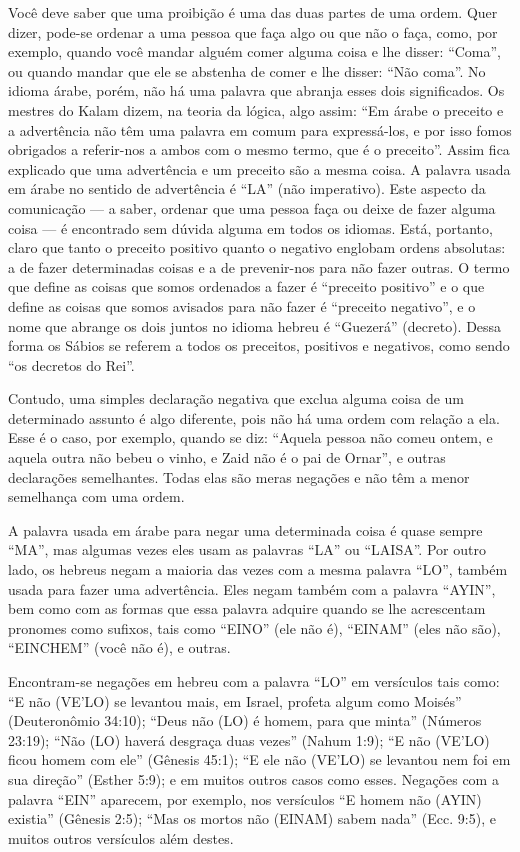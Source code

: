 Você deve saber que uma proibição é uma das duas partes de uma ordem.
Quer dizer, pode-se ordenar a uma pessoa que faça algo ou que não o
faça, como, por exemplo, quando você mandar alguém comer alguma coisa e
lhe disser: ``Coma'', ou quando mandar que ele se abstenha de comer e
lhe disser: ``Não coma''. No idioma árabe, porém, não há uma palavra que
abranja esses dois significados. Os mestres do Kalam dizem, na teoria da
lógica, algo assim: ``Em árabe o preceito e a advertência não têm uma
palavra em comum para expressá-los, e por isso fomos obrigados a
referir-nos a ambos com o mesmo termo, que é o preceito''. Assim fica
explicado que uma advertência e um preceito são a mesma coisa. A palavra
usada em árabe no sentido de advertência é ``LA'' (não imperativo).
Este aspecto da comunicação --- a saber, ordenar que uma pessoa faça ou
deixe de fazer alguma coisa --- é encontrado sem dúvida alguma em todos
os idiomas. Está, portanto, claro que tanto o preceito positivo quanto
o negativo englobam ordens absolutas: a de fazer determinadas coisas e
a de prevenir-nos para não fazer outras. O termo que define as coisas
que somos ordenados a fazer é ``preceito positivo'' e o que define as
coisas que somos avisados para não fazer é ``preceito negativo'', e o
nome que abrange os dois juntos no idioma hebreu é ``Guezerá''
(decreto). Dessa forma os Sábios se referem a todos os preceitos,
positivos e negativos, como sendo ``os decretos do Rei''.

Contudo, uma simples declaração negativa que exclua alguma coisa de um
determinado assunto é algo diferente, pois não há uma ordem com relação
a ela. Esse é o caso, por exemplo, quando se diz: ``Aquela pessoa não
comeu ontem, e aquela outra não bebeu o vinho, e Zaid não é o pai de
Ornar'', e outras declarações semelhantes. Todas elas são meras negações
e não têm a menor semelhança com uma ordem.

A palavra usada em árabe para negar uma determinada coisa é quase sempre
``MA'', mas algumas vezes eles usam as palavras ``LA'' ou ``LAISA''. Por
outro lado, os hebreus negam a maioria das vezes com a mesma palavra
``LO'', também usada para fazer uma advertência. Eles negam também com a
palavra ``AYIN'', bem como com as formas que essa palavra adquire quando
se lhe acrescentam pronomes como sufixos, tais como ``EINO'' (ele não
é), ``EINAM'' (eles não são), ``EINCHEM'' (você não é), e outras.

Encontram-se negações em hebreu com a palavra ``LO'' em versículos tais
como: ``E não (VE'LO) se levantou mais, em Israel, profeta algum como
Moisés'' (Deuteronômio 34:10); ``Deus não (LO) é homem, para que minta''
(Números 23:19); ``Não (LO) haverá desgraça duas vezes'' (Nahum 1:9);
``E não (VE'LO) ficou homem com ele'' (Gênesis 45:1); ``E ele não
(VE'LO) se levantou nem foi em sua direção'' (Esther 5:9); e em muitos
outros casos como esses. Negações com a palavra ``EIN'' aparecem, por
exemplo, nos versículos ``E homem não (AYIN) existia'' (Gênesis 2:5); ``Mas os mortos não (EINAM)
sabem nada'' (Ecc. 9:5), e muitos outros versículos além destes.

